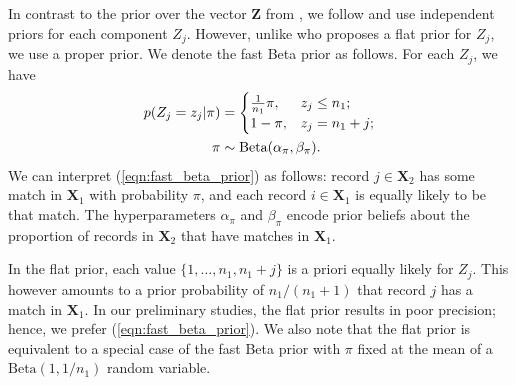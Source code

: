 \documentclass[ba]{imsart}
\begin{document}
In contrast to the prior over the vector $\bm{Z}$ from \cite{sadinle_bayesian_2017}, we follow \cite{wortman2019} and use independent priors for each component $Z_j$. However, unlike \cite{wortman2019} who proposes a flat prior for $Z_j$, we use a proper prior. We denote the fast Beta prior as follows. For each $Z_j$, we have
\begin{align}
	\label{eqn:fast_beta_prior}
	p(Z_j = z_j| \pi) &= \begin{cases} 
	\frac{1}{n_1}\pi,  & z_j \leq n_1; \\
	1-\pi, &  z_j  = n_1 + j; \\
\end{cases} \\
\pi &\sim \text{Beta}(\alpha_{\pi}, \beta_{\pi}) \notag.
\end{align}
We can interpret (\ref{eqn:fast_beta_prior}) as follows: record $j \in \bm{X}_2$ has some match in $\bm{X}_1$ with probability $\pi$, and each record $i \in \bm{X}_1$ is equally likely to be that match. The hyperparameters $\alpha_{\pi}$ and $\beta_{\pi}$ encode prior beliefs about  the proportion of records in $\bm{X}_2$ that have matches in $\bm{X}_1.$ 

In the \cite{wortman2019} flat prior, each value $\{1, \ldots, n_1, n_1 +j\}$ is a priori equally likely for $Z_j$. This however amounts to a prior probability of $n_1 / (n_1 + 1)$ that record $j$ has a match in $\bm{X}_1$. In our preliminary studies, the flat prior results in poor precision; hence, we prefer (\ref{eqn:fast_beta_prior}). We also note that the flat prior is equivalent to a special case of the fast Beta prior with $\pi$ fixed at the mean of a $\text{Beta}\left(1, 1 / n_1 \right)$ random variable.

\end{document}
